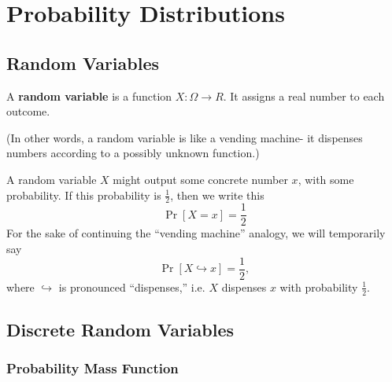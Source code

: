 \documentclass[../main.tex]{subfiles}
\begin{document}
\chapter{Probability Distributions}
\section{Random Variables}
\begin{definition}
A \textbf{random variable} is a function $X : \Omega \rightarrow R$. It assigns a real number to each outcome. 
\end{definition}
(In other words, a random variable is like a vending machine- it dispenses numbers according to a possibly unknown function.)

A random variable $X$ might output some concrete number $x$, with some probability. If this probability is $\frac 12$, then we write this
\[
	\Pr[X = x] = \frac 12
\]
For the sake of continuing the ``vending machine'' analogy, we will temporarily say \[\Pr[X \hookrightarrow x] = \frac 12,\] where $\hookrightarrow$ is pronounced ``dispenses,'' i.e. $X$ dispenses $x$ with probability $\frac 12$. 
\section{Discrete Random Variables}
\subsection{Probability Mass Function}
\end{document}
